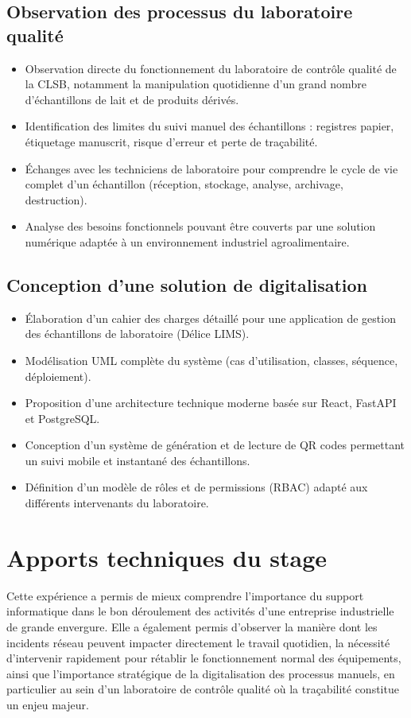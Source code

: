 \documentclass[12pt,a4paper,oneside]{report}
\begin{document}
\subsection{Observation des processus du laboratoire qualité}
\begin{itemize}[leftmargin=1.2cm]
\item Observation directe du fonctionnement du laboratoire de contrôle qualité de la CLSB, notamment la manipulation quotidienne d'un grand nombre d'échantillons de lait et de produits dérivés.
\item Identification des limites du suivi manuel des échantillons : registres papier, étiquetage manuscrit, risque d'erreur et perte de traçabilité.
\item Échanges avec les techniciens de laboratoire pour comprendre le cycle de vie complet d'un échantillon (réception, stockage, analyse, archivage, destruction).
\item Analyse des besoins fonctionnels pouvant être couverts par une solution numérique adaptée à un environnement industriel agroalimentaire.
\end{itemize}

\subsection{Conception d'une solution de digitalisation}
\begin{itemize}[leftmargin=1.2cm]
\item Élaboration d'un cahier des charges détaillé pour une application de gestion des échantillons de laboratoire (Délice LIMS).
\item Modélisation UML complète du système (cas d'utilisation, classes, séquence, déploiement).
\item Proposition d'une architecture technique moderne basée sur React, FastAPI et PostgreSQL.
\item Conception d'un système de génération et de lecture de QR codes permettant un suivi mobile et instantané des échantillons.
\item Définition d'un modèle de rôles et de permissions (RBAC) adapté aux différents intervenants du laboratoire.
\end{itemize}

\section{Apports techniques du stage}
Cette expérience a permis de mieux comprendre l'importance du support informatique dans le bon déroulement des activités d'une entreprise industrielle de grande envergure. Elle a également permis d'observer la manière dont les incidents réseau peuvent impacter directement le travail quotidien, la nécessité d'intervenir rapidement pour rétablir le fonctionnement normal des équipements, ainsi que l'importance stratégique de la digitalisation des processus manuels, en particulier au sein d'un laboratoire de contrôle qualité où la traçabilité constitue un enjeu majeur.
\end{document}
